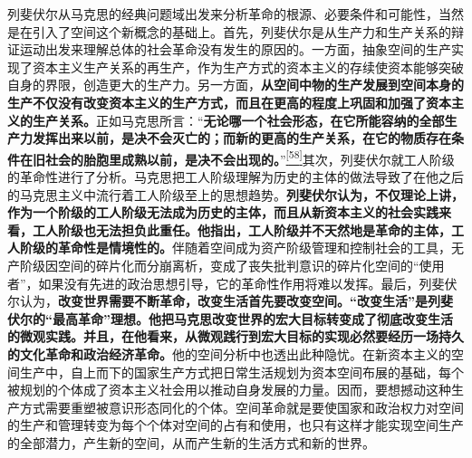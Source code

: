 \documentclass[UTF8, fontset = sourcesans, a4paper, oneside, zihao =
-4, scheme=chinese, no-math, space=true]{ctexbook}
\begin{document}
列斐伏尔从马克思的经典问题域出发来分析革命的根源、必要条件和可能性，当然是在引入了空间这个新概念的基础上。首先，列斐伏尔是从生产力和生产关系的辩证运动出发来理解总体的社会革命没有发生的原因的。一方面，抽象空间的生产实现了资本主义生产关系的再生产，作为生产方式的资本主义的存续使资本能够突破自身的界限，创造更大的生产力。另一方面，\textbf{从空间中物的生产发展到空间本身的生产不仅没有改变资本主义的生产方式，而且在更高的程度上巩固和加强了资本主义的生产关系。}正如马克思所言：``\textbf{无论哪一个社会形态，在它所能容纳的全部生产力发挥出来以前，是决不会灭亡的；而新的更高的生产关系，在它的物质存在条件在旧社会的胎胞里成熟以前，是决不会出现的。}''\protect\hypertarget{part0010_split_002.htmlux5cux23w58}{}{}\protect\hyperlink{part0010_split_002.htmlux5cux23m58}{\textsuperscript{{[}58{]}}}其次，列斐伏尔就工人阶级的革命性进行了分析。马克思把工人阶级理解为历史的主体的做法导致了在他之后的马克思主义中流行着工人阶级至上的思想趋势。\textbf{列斐伏尔认为，不仅理论上讲，作为一个阶级的工人阶级无法成为历史的主体，而且从新资本主义的社会实践来看，工人阶级也无法担负此重任。他指出，工人阶级并不天然地是革命的主体，工人阶级的革命性是情境性的。}伴随着空间成为资产阶级管理和控制社会的工具，无产阶级因空间的碎片化而分崩离析，变成了丧失批判意识的碎片化空间的``使用者''，如果没有先进的政治思想引导，它的革命性作用将难以发挥。最后，列斐伏尔认为，\textbf{改变世界需要不断革命，改变生活首先要改变空间。``改变生活''是列斐伏尔的``最高革命''理想。他把马克思改变世界的宏大目标转变成了彻底改变生活的微观实践。并且，在他看来，从微观践行到宏大目标的实现必然要经历一场持久的文化革命和政治经济革命。}他的空间分析中也透出此种隐忧。在新资本主义的空间生产中，自上而下的国家生产方式把日常生活规划为资本空间布展的基础，每个被规划的个体成了资本主义社会用以推动自身发展的力量。因而，要想撼动这种生产方式需要重塑被意识形态同化的个体。空间革命就是要使国家和政治权力对空间的生产和管理转变为每个个体对空间的占有和使用，也只有这样才能实现空间生产的全部潜力，产生新的空间，从而产生新的生活方式和新的世界。
\end{document}
